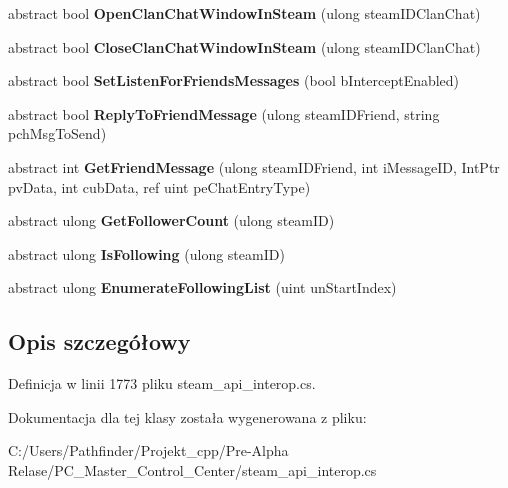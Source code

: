 \begin{DoxyCompactItemize}
abstract bool {\bfseries Open\+Clan\+Chat\+Window\+In\+Steam} (ulong steam\+I\+D\+Clan\+Chat)
\item 
\mbox{\label{class_valve_1_1_steamworks_1_1_i_steam_friends_a0769011f523cc6b5f20310ba5f423597}} 
abstract bool {\bfseries Close\+Clan\+Chat\+Window\+In\+Steam} (ulong steam\+I\+D\+Clan\+Chat)
\item 
\mbox{\label{class_valve_1_1_steamworks_1_1_i_steam_friends_af8afcc207edbec99ecd2e0375952206b}} 
abstract bool {\bfseries Set\+Listen\+For\+Friends\+Messages} (bool b\+Intercept\+Enabled)
\item 
\mbox{\label{class_valve_1_1_steamworks_1_1_i_steam_friends_addd3660ba06c73d5456f3365bb683d7d}} 
abstract bool {\bfseries Reply\+To\+Friend\+Message} (ulong steam\+I\+D\+Friend, string pch\+Msg\+To\+Send)
\item 
\mbox{\label{class_valve_1_1_steamworks_1_1_i_steam_friends_ad61c2e41e6aa54ef2f62dd97590d51df}} 
abstract int {\bfseries Get\+Friend\+Message} (ulong steam\+I\+D\+Friend, int i\+Message\+ID, Int\+Ptr pv\+Data, int cub\+Data, ref uint pe\+Chat\+Entry\+Type)
\item 
\mbox{\label{class_valve_1_1_steamworks_1_1_i_steam_friends_a4599c21323d16902fbec55aa1897c868}} 
abstract ulong {\bfseries Get\+Follower\+Count} (ulong steam\+ID)
\item 
\mbox{\label{class_valve_1_1_steamworks_1_1_i_steam_friends_a1cd0bdb2297fad8ccf0a9c3b260d2274}} 
abstract ulong {\bfseries Is\+Following} (ulong steam\+ID)
\item 
\mbox{\label{class_valve_1_1_steamworks_1_1_i_steam_friends_afb149a34db71a89977ed7b80402c450c}} 
abstract ulong {\bfseries Enumerate\+Following\+List} (uint un\+Start\+Index)
\end{DoxyCompactItemize}


\subsection{Opis szczegółowy}


Definicja w linii 1773 pliku steam\+\_\+api\+\_\+interop.\+cs.



Dokumentacja dla tej klasy została wygenerowana z pliku\+:\begin{DoxyCompactItemize}
\item 
C\+:/\+Users/\+Pathfinder/\+Projekt\+\_\+cpp/\+Pre-\/\+Alpha Relase/\+P\+C\+\_\+\+Master\+\_\+\+Control\+\_\+\+Center/steam\+\_\+api\+\_\+interop.\+cs\end{DoxyCompactItemize}
